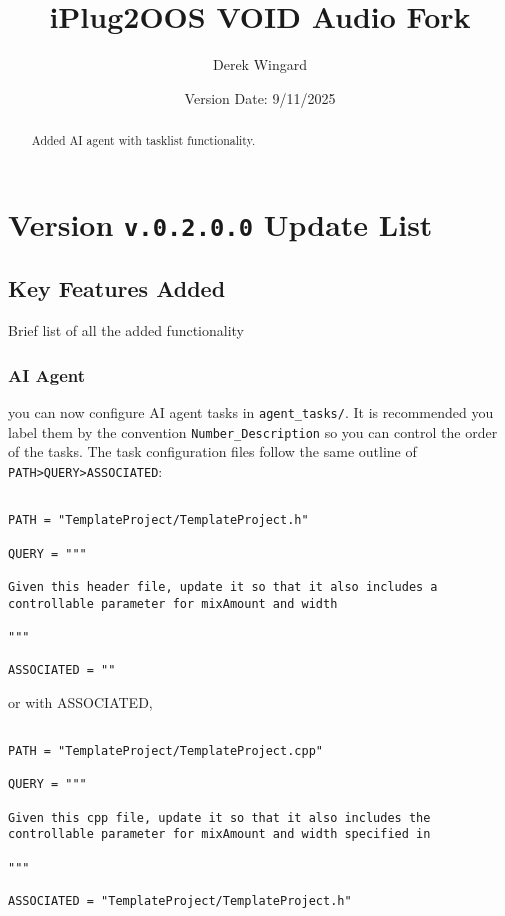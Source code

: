 \documentclass[twocolumn,natbib]{svjour3}        %
\begin{document}
\title{iPlug2OOS VOID Audio Fork}

\author{Derek Wingard}


\date{Version Date: 9/11/2025}

\maketitle

\begin{abstract}
    Added AI agent with tasklist functionality.
\end{abstract}

\section{Version \texttt{v.0.2.0.0} Update List}
\subsection{Key Features Added}
Brief list of all the added functionality
\subsubsection{AI Agent}
you can now configure AI agent tasks in \texttt{agent\_tasks/}. It is recommended you label them by the convention \texttt{Number\_Description} so you can control the order of the tasks. 
The task configuration files follow the same outline of \texttt{PATH>QUERY>ASSOCIATED}:

\begin{verbatim}

PATH = "TemplateProject/TemplateProject.h"

QUERY = """

Given this header file, update it so that it also includes a controllable parameter for mixAmount and width

"""

ASSOCIATED = ""

\end{verbatim}
or with ASSOCIATED,
\begin{verbatim}

PATH = "TemplateProject/TemplateProject.cpp"

QUERY = """

Given this cpp file, update it so that it also includes the controllable parameter for mixAmount and width specified in 

"""

ASSOCIATED = "TemplateProject/TemplateProject.h"

\end{verbatim}
\end{document}
